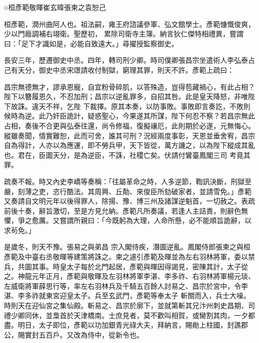 
\begin{pinyinscope}

 ○桓彥範敬暉崔玄暐張柬之袁恕己



 桓彥範，潤州曲阿人也。祖法嗣，雍王府諮議參軍、弘文館學士。彥範慷慨俊爽，少以門廕調補右翊衛。聖歷初，
 累除司衛寺主簿。納言狄仁傑特相禮異，嘗謂曰：「足下才識如是，必能自致遠大。」尋擢授監察御史。



 長安三年，歷遷御史中丞。四年，轉司刑少卿。時司僕卿張昌宗坐遣術人李弘泰占己有天分，御史中丞宋璟請收付制獄，窮理其罪，則天不許。彥範上疏曰：



 昌宗無德無才，謬承恩寵，自宜粉骨碎肌，以答殊造，豈得苞藏禍心，有此占相？陛下以簪履恩久，不忍加刑；昌宗以逆亂罪多，自招其咎。此是皇天降怒，非唯陛下故誅。違天不祥，乞陛
 下裁擇。原其本奏，以防事敗。事敗即言奏訖，不敗則候時為逆。此乃奸臣詭計，疑惑聖心，今果遂其所謀，陛下何忍不察？若昌宗無此占相，奏後不合更與弘泰往還，尚令修福，復擬禳厄，此則期於必遂，元無悔心。縱雖奏聞，情實難恕，此而可舍，誰其可刑？況經兩度事彰，天恩並垂舍宥，昌宗自為得計，人亦以為應運，即不勞兵甲，天下皆從，萬方譏之，以為陛下縱成其亂也。君在，臣圖天分，是為逆臣，不誅，社稷亡矣。伏請付鸞臺鳳閣三司
 考竟其罪。



 疏奏不報。時又內史李嶠等奏稱：「往屬革命之時，人多逆節，鞫訊決斷，刑獄至嚴，刻薄之吏，恣行酷法。其周興、丘勣、來俊臣所劾破家者，並請雪免。」彥範又奏請自文明元年以後得罪人，除揚、豫、博三州及諸謀逆魁首，一切赦之。表疏前後十奏，辭旨激切，至是方見允納。彥範凡所奏議，若逢人主詰責，則辭色無懼，爭之愈厲。又嘗謂所親曰：「今既躬為大理，人命所懸，必不能順旨詭辭，以求茍免。」



 是歲冬，則天不豫。張易之與弟昌
 宗入閣侍疾，潛圖逆亂。鳳閣侍郎張柬之與桓彥範及中臺右丞敬暉等建策將誅之。柬之遽引彥範及暉並為左右羽林將軍，委以禁兵，共圖其事。時皇太子每於北門起居，彥範與暉因得謁見，密陳其計，太子從之。神龍元年正月，彥範與敬暉及左羽林將軍李湛、李多祚、右羽林將軍楊元琰、左威衛將軍薛思行等，率左右羽林兵及千騎五百餘人討易之、昌宗於宮中，令李湛、李多祚就東宮迎皇太子。兵至玄武門，彥範等奉太子
 斬關而入，兵士大噪。時則天在迎仙宮之集仙殿。斬易之、昌宗於廓下，並就第斬其兄汴州刺史昌期、司禮少卿同休，並梟首於天津橋南。士庶見者，莫不歡叫相賀，或臠割其肉，一夕都盡。明日，太子即位，彥範以功加銀青光祿大夫，拜納言，賜勛上柱國，封譙郡公，賜實封五百戶。又改為侍中，從新令也。




\end{pinyinscope}
